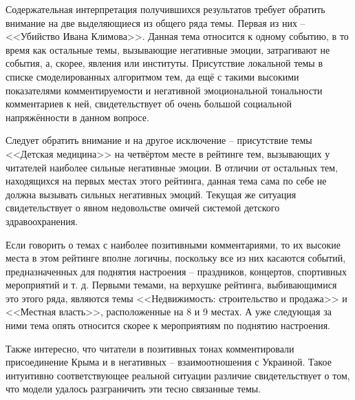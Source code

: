 Содержательная интерпретация получившихся результатов требует обратить внимание на две выделяющиеся из общего ряда темы. Первая из них -- <<Убийство Ивана Климова>>. Данная тема относится к одному событию, в то время как остальные темы, вызывающие негативные эмоции, затрагивают не события, а, скорее, явления или институты. Присутствие локальной темы в списке смоделированных алгоритмом тем, да ещё с такими высокими показателями комментируемости и негативной эмоциональной тональности комментариев к ней, свидетельствует об очень большой социальной напряжённости в данном вопросе.

Следует обратить внимание и на другое исключение -- присутствие темы <<Детская медицина>> на четвёртом месте в рейтинге тем, вызывающих у читателей наиболее сильные негативные эмоции. В отличии от остальных тем, находящихся на первых местах этого рейтинга, данная тема сама по себе не должна вызывать сильных негативных эмоций. Текущая же ситуация свидетельствует о явном недовольстве омичей системой детского здравоохранения.

Если говорить о темах с наиболее позитивными комментариями, то их высокие места в этом рейтинге вполне логичны, поскольку все из них касаются событий, предназначенных для поднятия настроения -- праздников, концертов, спортивных мероприятий и т. д. Первыми темами, на верхушке рейтинга, выбивающимися это этого ряда, являются темы <<Недвижимость: строительство и продажа>> и <<Местная власть>>, расположенные на 8 и 9 местах. А уже следующая за ними тема опять относится скорее к мероприятиям по поднятию настроения.

Также интересно, что читатели в позитивных тонах комментировали присоединение Крыма и в негативных -- взаимоотношения с Украиной. Такое интуитивно соответствующее реальной ситуации различие свидетельствует о том, что модели удалось разграничить эти тесно связанные темы.



\clearpage